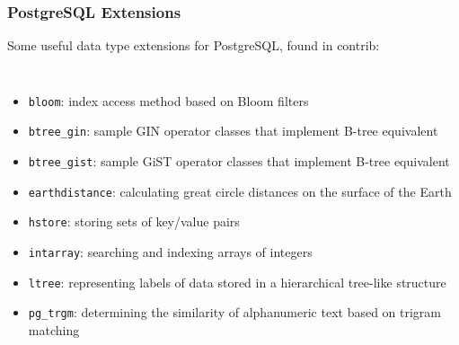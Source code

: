 \documentclass[xcolor=dvipsnames]{beamer}
\begin{document}
{
 
  \begin{frame}
    \frametitle{PostgreSQL Extensions}

    Some useful data type extensions for PostgreSQL, found in contrib:

    \vfill

    \begin{columns}[c]
      \column{\textwidth}
      \begin{itemize}
      \item \texttt{bloom}: index access method based on Bloom filters
      \item \texttt{btree\_gin}: sample GIN operator classes that implement B-tree equivalent
      \item \texttt{btree\_gist}: sample GiST operator classes that implement B-tree equivalent
      \item \texttt{earthdistance}: calculating great circle distances on
        the surface of the Earth
      \item \texttt{hstore}: storing sets of key/value pairs
      \item \texttt{intarray}: searching and indexing arrays of integers
      \item \texttt{ltree}: representing labels of data stored in a hierarchical tree-like structure
      \item \texttt{pg\_trgm}: determining the similarity of alphanumeric text based on trigram matching
      \end{itemize}
    \end{columns}    
  \end{frame}
}
\end{document}
